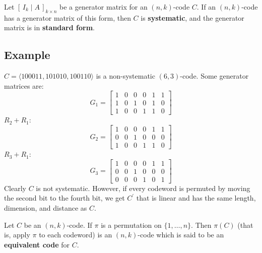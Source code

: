 \begin{defbox}
    \begin{definition}
    Let $ \left[\, I_k\mid A \,\right]_{k\times n} $ be a generator matrix
    for an $ (n,k) $-code $ C $. If an $ (n,k) $-code has a generator
    matrix of this form, then $ C $ is \textbf{systematic}, and the generator
    matrix is in \textbf{standard form}.
\end{definition} \end{defbox}

\begin{exbox}
    \subsection{Example}
    $ C=\langle 100011,101010,100110\rangle $
    is a non-systematic $ (6,3) $-code.
    Some generator matrices are:
    \[ G_1=\left[
    \begin{array}{ccc|ccc}
        1 & 0 & 0 & 0 & 1 & 1\\
        1 & 0 & 1 & 0 & 1 & 0\\
        1 & 0 & 0 & 1 & 1 & 0
    \end{array} \right] \]
    $ R_2+R_1 $:
    \[ G_2= \left[
    \begin{array}{ccc|ccc}
        1 & 0 & 0 & 0 & 1 & 1\\
        0 & 0 & 1 & 0 & 0 & 0\\
        1 & 0 & 0 & 1 & 1 & 0
    \end{array} \right] \]
    $ R_3+R_1 $:
    \[ G_3=\left[
    \begin{array}{ccc|ccc}
        1 & 0 & 0 & 0 & 1 & 1\\
        0 & 0 & 1 & 0 & 0 & 0\\
        0 & 0 & 0 & 1 & 0 & 1
    \end{array} \right] \]
    Clearly $ C $ is not systematic. However, if every codeword
    is permuted by moving the second bit to the fourth bit, we get $ C^{\prime} $
    that is linear and has the same length, dimension, and distance as $ C $.
\end{exbox}

\begin{defbox}
    \begin{definition}
    Let $ C $ be an $ (n,k) $-code. If $ \pi $ is a permutation on
    $ \{1,\ldots ,n\} $. Then $ \pi(C) $ (that is, apply $ \pi $ to each
    codeword) is an $ (n,k) $-code which is said to be an \textbf{equivalent code}
    for $ C $.
\end{definition} \end{defbox}

